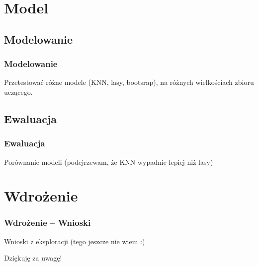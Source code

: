 \documentclass{beamer}
\begin{document}
	\section{Model}
	\subsection{Modelowanie}
	\begin{frame}
		\frametitle{Modelowanie}
		Przetestować różne modele (KNN, lasy, bootsrap), na różnych wielkościach zbioru uczącego.
		
	\end{frame}
	\subsection{Ewaluacja}
\begin{frame}
	\frametitle{Ewaluacja}
	Porównanie modeli (podejrzewam, że KNN wypadnie lepiej niż lasy)
	
\end{frame}

	\section{Wdrożenie}
		\begin{frame}
			\frametitle{Wdrożenie -- Wnioski}
			Wnioski z eksploracji (tego jeszcze nie wiem :)
			
				\vspace{0.5cm}
			
			\centering\Large{Dziękuję za uwagę!}
			
		\end{frame}
		
\end{document}
